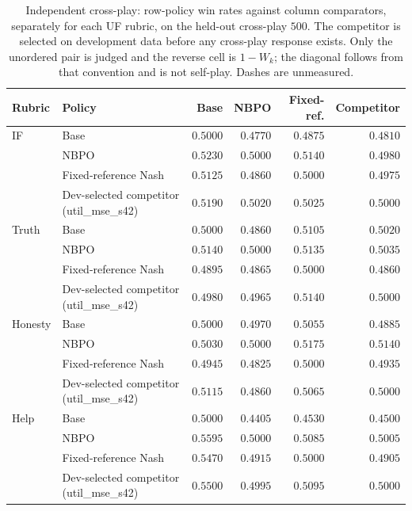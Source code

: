 \documentclass{article}
\theoremstyle{remark}
\theoremstyle{plain}
\begin{document}
\begin{table}[htbp]
\centering\scriptsize
\setlength{\tabcolsep}{4pt}
\caption{Independent cross-play: row-policy win rates against column comparators, separately for each UF rubric, on the held-out cross-play $500$. The competitor is selected on development data before any cross-play response exists. Only the unordered pair is judged and the reverse cell is $1-W_k$; the diagonal follows from that convention and is not self-play. Dashes are unmeasured.}
\label{tab:crossplay-matrices}
\begin{tabular}{llrrrr}
\toprule
Rubric & Policy & Base & NBPO & Fixed-ref. & Competitor\\
\midrule
IF & Base & $0.5000$ & $0.4770$ & $0.4875$ & $0.4810$\\
 & NBPO & $0.5230$ & $0.5000$ & $0.5140$ & $0.4980$\\
 & Fixed-reference Nash & $0.5125$ & $0.4860$ & $0.5000$ & $0.4975$\\
 & Dev-selected competitor (util\_mse\_s42) & $0.5190$ & $0.5020$ & $0.5025$ & $0.5000$\\
\midrule
Truth & Base & $0.5000$ & $0.4860$ & $0.5105$ & $0.5020$\\
 & NBPO & $0.5140$ & $0.5000$ & $0.5135$ & $0.5035$\\
 & Fixed-reference Nash & $0.4895$ & $0.4865$ & $0.5000$ & $0.4860$\\
 & Dev-selected competitor (util\_mse\_s42) & $0.4980$ & $0.4965$ & $0.5140$ & $0.5000$\\
\midrule
Honesty & Base & $0.5000$ & $0.4970$ & $0.5055$ & $0.4885$\\
 & NBPO & $0.5030$ & $0.5000$ & $0.5175$ & $0.5140$\\
 & Fixed-reference Nash & $0.4945$ & $0.4825$ & $0.5000$ & $0.4935$\\
 & Dev-selected competitor (util\_mse\_s42) & $0.5115$ & $0.4860$ & $0.5065$ & $0.5000$\\
\midrule
Help & Base & $0.5000$ & $0.4405$ & $0.4530$ & $0.4500$\\
 & NBPO & $0.5595$ & $0.5000$ & $0.5085$ & $0.5005$\\
 & Fixed-reference Nash & $0.5470$ & $0.4915$ & $0.5000$ & $0.4905$\\
 & Dev-selected competitor (util\_mse\_s42) & $0.5500$ & $0.4995$ & $0.5095$ & $0.5000$\\
\bottomrule
\end{tabular}
\end{table}
\end{document}

